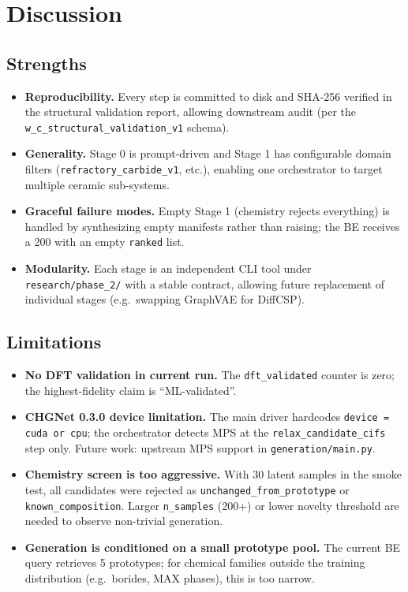 \documentclass[11pt,a4paper]{report}
\begin{document}
\chapter{Discussion}

\section{Strengths}

\begin{itemize}[leftmargin=*,itemsep=2pt]
\item \textbf{Reproducibility.} Every step is committed to disk and SHA-256 verified in the
      structural validation report, allowing downstream audit (per the
      \texttt{w\_c\_structural\_validation\_v1} schema).
\item \textbf{Generality.} Stage 0 is prompt-driven and Stage 1 has configurable domain
      filters (\texttt{refractory\_carbide\_v1}, etc.), enabling one orchestrator to
      target multiple ceramic sub-systems.
\item \textbf{Graceful failure modes.} Empty Stage 1 (chemistry rejects everything) is
      handled by synthesizing empty manifests rather than raising; the BE receives a 200
      with an empty \texttt{ranked} list.
\item \textbf{Modularity.} Each stage is an independent CLI tool under
      \texttt{research/phase\_2/} with a stable contract, allowing future replacement of
      individual stages (e.g.\ swapping GraphVAE for DiffCSP).
\end{itemize}

\section{Limitations}

\begin{itemize}[leftmargin=*,itemsep=2pt]
\item \textbf{No DFT validation in current run.} The \texttt{dft\_validated} counter is
      zero; the highest-fidelity claim is ``ML-validated''.
\item \textbf{CHGNet 0.3.0 device limitation.} The main driver hardcodes \texttt{device =
      cuda or cpu}; the orchestrator detects MPS at the \texttt{relax\_candidate\_cifs}
      step only. Future work: upstream MPS support in \texttt{generation/main.py}.
\item \textbf{Chemistry screen is too aggressive.} With 30 latent samples in the smoke
      test, all candidates were rejected as \texttt{unchanged\_from\_prototype} or
      \texttt{known\_composition}. Larger \texttt{n\_samples} (200+) or lower novelty
      threshold are needed to observe non-trivial generation.
\item \textbf{Generation is conditioned on a small prototype pool.} The current BE query
      retrieves 5 prototypes; for chemical families outside the training distribution
      (e.g.\ borides, MAX phases), this is too narrow.
\end{itemize}
\end{document}

